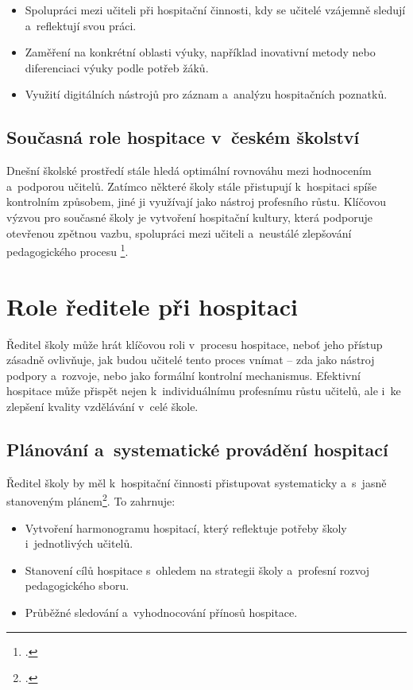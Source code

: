 \begin{itemize}
    \item Spolupráci mezi učiteli při hospitační činnosti, kdy se učitelé vzájemně sledují a~reflektují svou práci.

    \item Zaměření na konkrétní oblasti výuky, například inovativní metody nebo diferenciaci výuky podle potřeb žáků.

    \item Využití digitálních nástrojů pro záznam a~analýzu hospitačních poznatků.
\end{itemize}

\subsection{Současná role hospitace v~českém školství}

Dnešní školské prostředí stále hledá optimální rovnováhu mezi hodnocením a~podporou učitelů. Zatímco některé školy stále přistupují k~hospitaci spíše kontrolním způsobem, jiné ji využívají jako nástroj profesního růstu. Klíčovou výzvou pro současné školy je vytvoření hospitační kultury, která podporuje otevřenou zpětnou vazbu, spolupráci mezi učiteli a~neustálé zlepšování pedagogického procesu \footcite[120]{ped-proces-rizeni}.


\section{Role ředitele při hospitaci}

Ředitel školy může hrát klíčovou roli v~procesu hospitace, neboť jeho přístup zásadně ovlivňuje, jak budou učitelé tento proces vnímat – zda jako nástroj podpory a~rozvoje, nebo jako formální kontrolní mechanismus. Efektivní hospitace může přispět nejen k~individuálnímu profesnímu růstu učitelů, ale i~ke zlepšení kvality vzdělávání v~celé škole.

\subsection{Plánování a~systematické provádění hospitací}
Ředitel školy by měl k~hospitační činnosti přistupovat systematicky a~s~jasně stanoveným plánem\footcite[124]{ped-proces-rizeni}. To zahrnuje:

\begin{itemize}
    \item Vytvoření harmonogramu hospitací, který reflektuje potřeby školy i~jednotlivých učitelů.
    \item Stanovení cílů hospitace s~ohledem na strategii školy a~profesní rozvoj pedagogického sboru.
    \item Průběžné sledování a~vyhodnocování přínosů hospitace.
\end{itemize}

